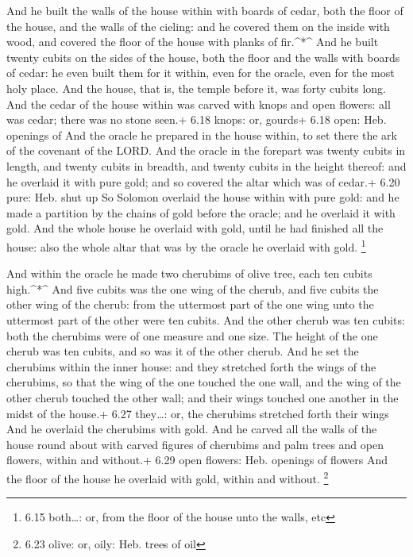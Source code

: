  And he built the walls of the house within with boards of
cedar, both the floor of the house, and the walls of the cieling: and he
covered them on the inside with wood, and covered the floor of the house
with planks of fir.\^{}*\^{}  And he built twenty cubits on
the sides of the house, both the floor and the walls with boards of
cedar: he even built them for it within, even for the oracle, even for
the most holy place.  And the house, that is, the temple
before it, was forty cubits long.  And the cedar of the
house within was carved with knops and open flowers: all was cedar;
there was no stone seen.+ 6.18 knops: or, gourds+ 6.18 open: Heb.
openings of  And the oracle he prepared in the house
within, to set there the ark of the covenant of the LORD. 
And the oracle in the forepart was twenty cubits in length, and twenty
cubits in breadth, and twenty cubits in the height thereof: and he
overlaid it with pure gold; and so covered the altar which was of
cedar.+ 6.20 pure: Heb. shut up  So Solomon overlaid the
house within with pure gold: and he made a partition by the chains of
gold before the oracle; and he overlaid it with gold.  And
the whole house he overlaid with gold, until he had finished all the
house: also the whole altar that was by the oracle he overlaid with
gold. \footnote{6.15 both\ldots: or, from the floor of the house unto
  the walls, etc}

 And within the oracle he made two cherubims of olive tree,
each ten cubits high.\^{}*\^{}  And five cubits was the one
wing of the cherub, and five cubits the other wing of the cherub: from
the uttermost part of the one wing unto the uttermost part of the other
were ten cubits.  And the other cherub was ten cubits: both
the cherubims were of one measure and one size.  The height
of the one cherub was ten cubits, and so was it of the other cherub.
 And he set the cherubims within the inner house: and they
stretched forth the wings of the cherubims, so that the wing of the one
touched the one wall, and the wing of the other cherub touched the other
wall; and their wings touched one another in the midst of the house.+
6.27 they\ldots: or, the cherubims stretched forth their wings
 And he overlaid the cherubims with gold.  And
he carved all the walls of the house round about with carved figures of
cherubims and palm trees and open flowers, within and without.+ 6.29
open flowers: Heb. openings of flowers  And the floor of
the house he overlaid with gold, within and without. \footnote{6.23
  olive: or, oily: Heb. trees of oil}

